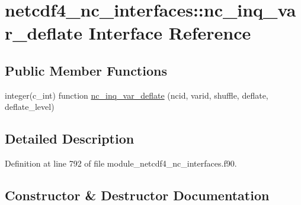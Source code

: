 \hypertarget{interfacenetcdf4__nc__interfaces_1_1nc__inq__var__deflate}{}\section{netcdf4\+\_\+nc\+\_\+interfaces\+:\+:nc\+\_\+inq\+\_\+var\+\_\+deflate Interface Reference}
\label{interfacenetcdf4__nc__interfaces_1_1nc__inq__var__deflate}
\subsection*{Public Member Functions}
\begin{DoxyCompactItemize}
\item 
integer(c\+\_\+int) function \hyperlink{interfacenetcdf4__nc__interfaces_1_1nc__inq__var__deflate_a1c67c1ed74e6b0d8d71d18ccc908e2ce}{nc\+\_\+inq\+\_\+var\+\_\+deflate} (ncid, varid, shuffle, deflate, deflate\+\_\+level)
\end{DoxyCompactItemize}


\subsection{Detailed Description}


Definition at line 792 of file module\+\_\+netcdf4\+\_\+nc\+\_\+interfaces.\+f90.



\subsection{Constructor \& Destructor Documentation}
\mbox{\label{interfacenetcdf4__nc__interfaces_1_1nc__inq__var__deflate_a1c67c1ed74e6b0d8d71d18ccc908e2ce}} 
